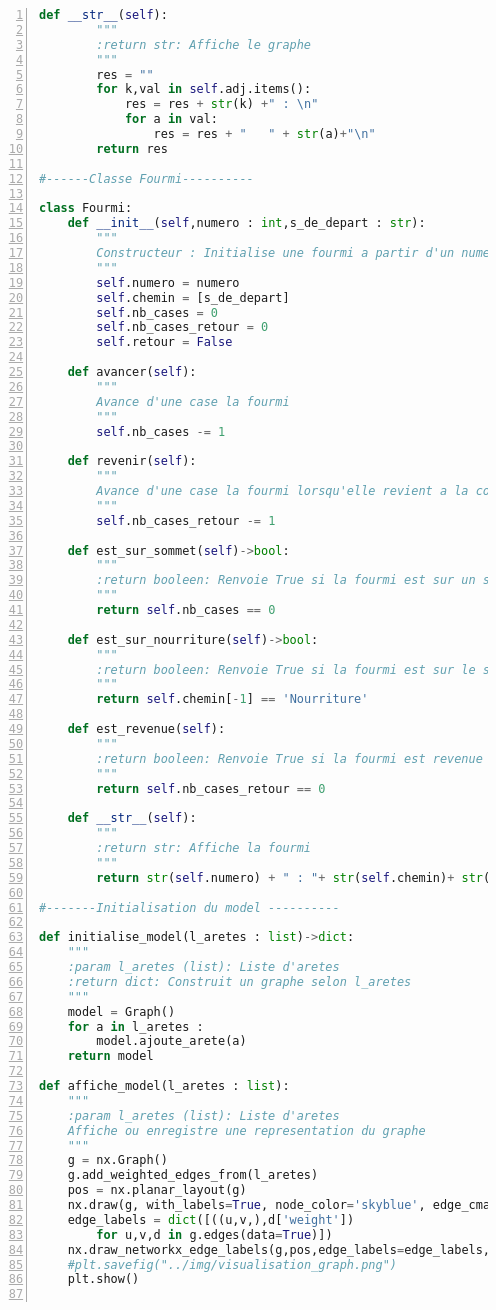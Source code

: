 \documentclass[
12pt,
french,
]{article}
\begin{document}
\begin{lstlisting}[language=Python, numbers=left, label=colonies_fourmis]
    def __str__(self):
        """
        :return str: Affiche le graphe
        """
        res = ""
        for k,val in self.adj.items():
            res = res + str(k) +" : \n"
            for a in val:
                res = res + "   " + str(a)+"\n"
        return res

#------Classe Fourmi----------

class Fourmi:
    def __init__(self,numero : int,s_de_depart : str):
        """
        Constructeur : Initialise une fourmi a partir d'un numero de fourmi et d'un sommet de depart
        """
        self.numero = numero
        self.chemin = [s_de_depart]
        self.nb_cases = 0
        self.nb_cases_retour = 0
        self.retour = False

    def avancer(self):
        """
        Avance d'une case la fourmi
        """
        self.nb_cases -= 1

    def revenir(self):
        """
        Avance d'une case la fourmi lorsqu'elle revient a la colonie
        """
        self.nb_cases_retour -= 1

    def est_sur_sommet(self)->bool:
        """
        :return booleen: Renvoie True si la fourmi est sur un sommet, False sinon
        """
        return self.nb_cases == 0

    def est_sur_nourriture(self)->bool:
        """
        :return booleen: Renvoie True si la fourmi est sur le sommet de nourriture, False sinon
        """
        return self.chemin[-1] == 'Nourriture'

    def est_revenue(self):
        """
        :return booleen: Renvoie True si la fourmi est revenue a la colonie, False sinon
        """
        return self.nb_cases_retour == 0

    def __str__(self):
        """
        :return str: Affiche la fourmi
        """
        return str(self.numero) + " : "+ str(self.chemin)+ str(self.nb_cases)

#-------Initialisation du model ----------

def initialise_model(l_aretes : list)->dict:
    """
    :param l_aretes (list): Liste d'aretes
    :return dict: Construit un graphe selon l_aretes
    """
    model = Graph()
    for a in l_aretes :
        model.ajoute_arete(a)
    return model

def affiche_model(l_aretes : list):
    """
    :param l_aretes (list): Liste d'aretes
    Affiche ou enregistre une representation du graphe
    """
    g = nx.Graph()
    g.add_weighted_edges_from(l_aretes)
    pos = nx.planar_layout(g)
    nx.draw(g, with_labels=True, node_color='skyblue', edge_cmap=plt.cm.Blues, pos = pos)
    edge_labels = dict([((u,v,),d['weight'])
        for u,v,d in g.edges(data=True)])
    nx.draw_networkx_edge_labels(g,pos,edge_labels=edge_labels,label_pos = 0.5, font_color='red', rotate = True)
    #plt.savefig("../img/visualisation_graph.png")
    plt.show()


\end{lstlisting}
\end{document}
